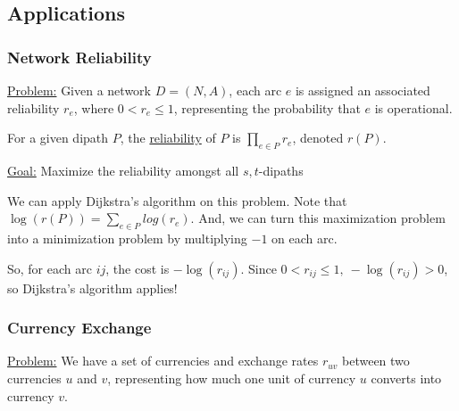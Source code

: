 \subsection{Applications}
\subsubsection{Network Reliability}
\underline{Problem:} Given a network $D = (N,A)$, each arc $e$ is assigned an associated reliability $r_e$, where $0 < r_e \leq 1$, representing the probability that $e$ is operational.

\begin{minipage}{\textwidth}
    \centering
\end{minipage}

For a given dipath $P$, the \underline{reliability} of $P$ is $\prod_{e \in P} r_e$, denoted $r(P)$.

\underline{Goal:} Maximize the reliability amongst all $s,t$-dipaths

We can apply Dijkstra's algorithm on this problem. Note that $\log(r(P)) = \sum_{e \in P} log(r_e)$. And, we can turn this maximization problem into a minimization problem by multiplying $-1$ on each arc.

So, for each arc $ij$, the cost is $-\log(r_{ij})$. Since $0 < r_{ij} \leq 1,\:-\log(r_{ij}) > 0$, so Dijkstra's algorithm applies!
 
\subsubsection{Currency Exchange}
\underline{Problem:} We have a set of currencies and exchange rates $r_{uv}$ between two currencies $u$ and $v$, representing how much one unit of currency $u$ converts into currency $v$.

